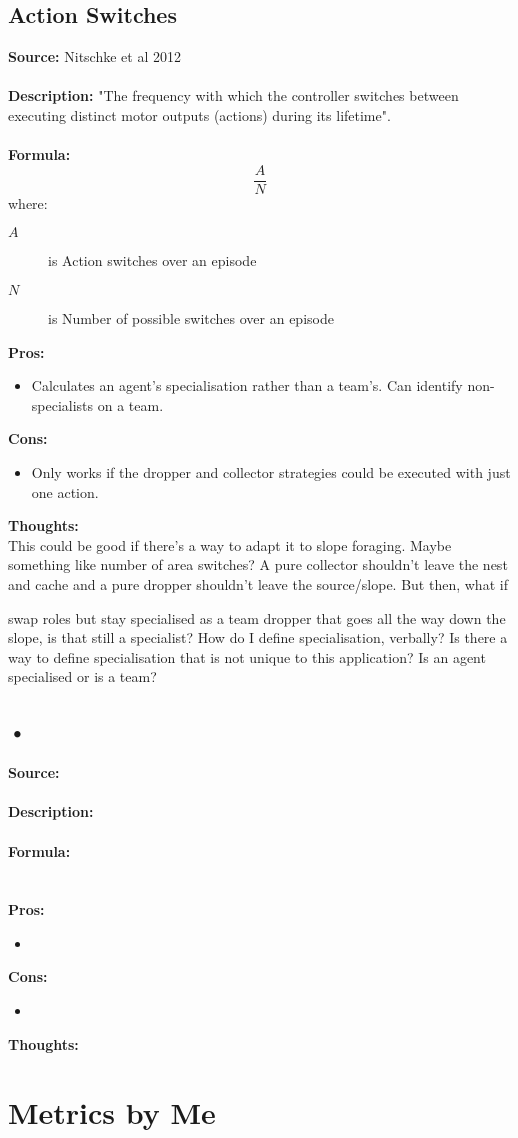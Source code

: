 \documentclass[12pt]{article}
\begin{document}
\subsection{Action Switches}
\textbf{Source: } Nitschke et al 2012 \cite{nitschke:SEC:2012} \\\\
\textbf{Description: } "The frequency with which the controller switches between executing distinct motor outputs (actions) during its lifetime".\\\\
\textbf{Formula: }\\
%
\[
\frac{A}{N}
\]
%
where:
\begin{description}
\item[$A$] is Action switches over an episode
\item[$N$] is Number of possible switches over an episode
\end{description}
\textbf{Pros:}
\begin{itemize}
\item Calculates an agent's specialisation rather than a team's. Can identify non-specialists on a team.
\end{itemize}
\textbf{Cons:}
\begin{itemize}
\item Only works if the dropper and collector strategies could be executed with just one action.
\end{itemize}
\textbf{Thoughts:}\\
This could be good if there's a way to adapt it to slope foraging.
Maybe something like number of area switches?
A pure collector shouldn't leave the nest and cache and a pure dropper shouldn't leave the source/slope.
But then, what if 

swap roles but stay specialised as a team
dropper that goes all the way down the slope, is that still a specialist?
How do I define specialisation, verbally?
Is there a way to define specialisation that is not unique to this application?
Is an agent specialised or is a team?

\subsection{•}

\textbf{Source: } \\\\
\textbf{Description: } \\\\
\textbf{Formula: }\\
%
%
\\\\
\textbf{Pros:}
\begin{itemize}
\item 
\end{itemize}
\textbf{Cons:}
\begin{itemize}
\item 
\end{itemize}
\textbf{Thoughts:}\\

\section{Metrics by Me}

 

\end{document}
